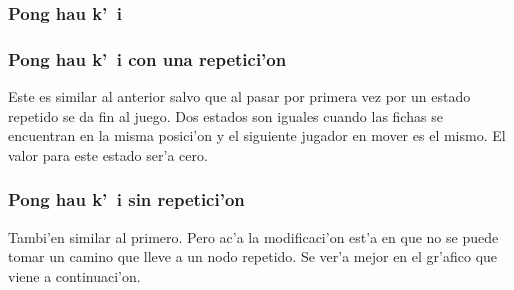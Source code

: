 \subsubsection{Pong hau k'\ i}

\clearpage

\subsubsection{Pong hau k'\ i con una repetici'on}

Este es similar al anterior salvo que al pasar por primera vez por un estado repetido se da fin al juego. Dos estados son iguales cuando las fichas se encuentran en la misma posici'on y el siguiente jugador en mover es el mismo. El valor para este estado ser'a cero.

\clearpage

\subsubsection{Pong hau k'\ i sin repetici'on}

Tambi'en similar al primero. Pero ac'a la modificaci'on est'a en que no se puede tomar un camino que lleve a un nodo repetido. Se ver'a mejor en el gr'afico que viene a continuaci'on.

\clearpage











